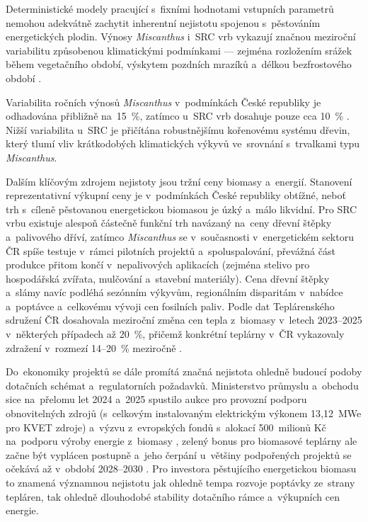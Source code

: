 Deterministické modely pracující s~fixními hodnotami vstupních parametrů 
nemohou adekvátně zachytit inherentní nejistotu spojenou s~pěstováním 
energetických plodin. Výnosy \textit{Miscanthus} i~SRC vrb vykazují 
značnou meziroční variabilitu způsobenou klimatickými podmínkami --- 
zejména rozložením srážek během vegetačního období, výskytem pozdních 
mrazíků a~délkou bezfrostového období \citep{CliftonBrown2024}.

Variabilita ročních výnosů \textit{Miscanthus} v~podmínkách
České republiky je odhadována přibližně na~15~\%, zatímco u~SRC
vrb dosahuje pouze cca 10~\% \citep{knapek_2024}. Nižší
variabilita u~SRC je přičítána robustnějšímu kořenovému
systému dřevin, který tlumí vliv krátkodobých klimatických
výkyvů ve~srovnání s~trvalkami typu \textit{Miscanthus}.

Dalším klíčovým zdrojem nejistoty jsou tržní ceny biomasy a~energií.
Stanovení reprezentativní výkupní ceny je v~podmínkách České republiky
obtížné, neboť trh s~cíleně pěstovanou energetickou biomasou je
úzký a~málo likvidní. Pro SRC vrbu existuje alespoň částečně
funkční trh navázaný na~ceny dřevní štěpky a~palivového dříví, zatímco
\textit{Miscanthus} se v~současnosti v~energetickém sektoru ČR spíše
testuje v~rámci pilotních projektů a~spoluspalování, převážná část
produkce přitom končí v~nepalivových aplikacích (zejména stelivo
pro hospodářská zvířata, mulčování a~stavební materiály). Cena dřevní
štěpky a~slámy navíc podléhá sezónním výkyvům, regionálním disparitám
v~nabídce a~poptávce a~celkovému vývoji cen fosilních paliv. Podle dat
Teplárenského sdružení ČR dosahovala meziroční změna cen tepla
z~biomasy v~letech 2023--2025 v~některých případech až 20~\%,
přičemž konkrétní teplárny v~ČR vykazovaly zdražení v~rozmezí
14--20~\% meziročně \citep{tscr_2024}.

Do~ekonomiky projektů se dále promítá značná nejistota ohledně 
budoucí podoby dotačních schémat a~regulatorních požadavků. 
Ministerstvo průmyslu a~obchodu sice na~přelomu let 2024 a~2025 
spustilo aukce pro provozní podporu obnovitelných zdrojů 
(s~celkovým instalovaným elektrickým výkonem 13{,}12~MWe pro KVET 
zdroje) a~výzvu z~evropských fondů s~alokací 500~milionů Kč 
na~podporu výroby energie z~biomasy \citep{oEnergetice2025_podpora}, 
zelený bonus pro biomasové teplárny ale začne být vyplácen 
postupně a~jeho čerpání u~většiny podpořených projektů se 
očekává až v~období 2028--2030 \citep{oEnergetice2025_podpora}. 
Pro investora pěstujícího energetickou biomasu to znamená 
významnou nejistotu jak ohledně tempa rozvoje poptávky 
ze~strany tepláren, tak ohledně dlouhodobé stability dotačního 
rámce a~výkupních cen energie.
